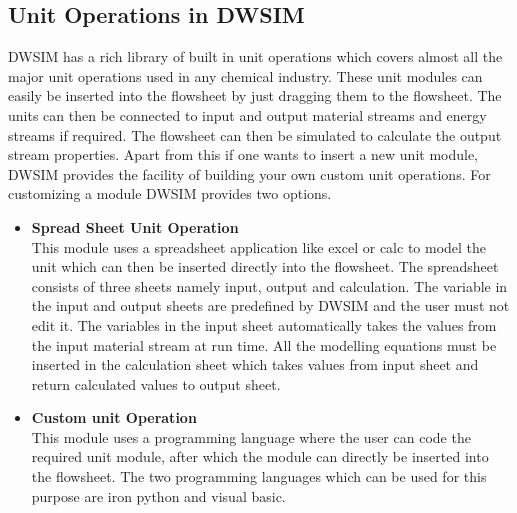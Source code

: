 \documentclass[12pt]{report}
\begin{document}
\subsection{Unit Operations in DWSIM}

DWSIM has a rich library of built in unit operations which covers almost all the major unit operations used in any chemical industry. These unit modules can easily be inserted into the flowsheet by just dragging them to the flowsheet. The units can then be connected to input and output material streams and energy streams if required. The flowsheet can then be simulated to calculate the output stream properties.
Apart from this if one wants to insert a new unit module, DWSIM provides the facility of building your own custom unit operations. For customizing a module DWSIM provides two options.

\begin{itemize}
\item {\textbf{Spread Sheet Unit Operation}} \\
This module uses a spreadsheet application like excel or calc to model the unit which can then be inserted directly into the flowsheet. The spreadsheet consists of three sheets namely input, output and calculation. The variable in the input and output sheets are predefined by DWSIM and the user must not edit it. The variables in the input sheet automatically takes the values from the input material stream at run time. All the modelling equations must be inserted in the calculation sheet which takes values from input sheet and return calculated values to output sheet.
\item{\textbf{Custom unit Operation}} \\
This module uses a programming language where the user can code the required unit module, after which the module can directly be inserted into the flowsheet. The two programming languages which can be used for this purpose are iron python and visual basic.
\end{itemize}
\end{document}
